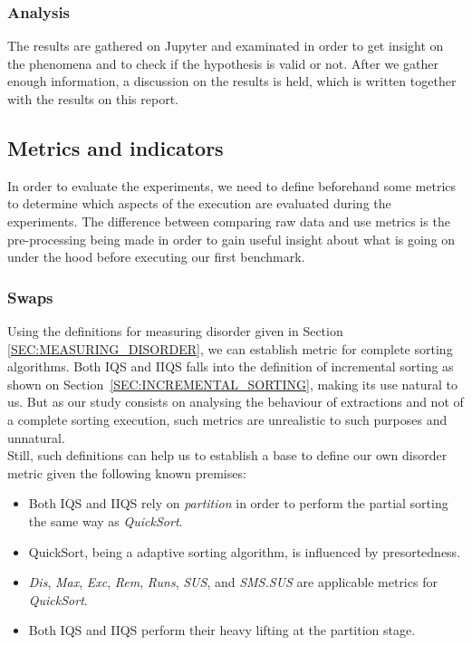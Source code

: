 \subsubsection{Analysis}
The results are gathered on Jupyter and examinated in order to get insight on the phenomena and to check if the hypothesis is valid or not. After we gather enough information, a discussion on the results is held, which is written together with the results on this report.\\

\subsection{Metrics and indicators}
In order to evaluate the experiments, we need to define beforehand some metrics to determine which aspects of the execution are evaluated during the experiments. The difference between comparing raw data and use metrics is the pre-processing being made in order to gain useful insight about what is going on under the hood before executing our first benchmark.\\

\subsubsection{Swaps}
Using the definitions for measuring disorder given in Section \ref{SEC:MEASURING_DISORDER}, we can establish metric for complete sorting algorithms. Both IQS and IIQS falls into the definition of incremental sorting as shown on Section~\ref{SEC:INCREMENTAL_SORTING}, making its use natural to us. But as our study consists on analysing the behaviour of extractions and not of a complete sorting execution, such metrics are unrealistic to such purposes and unnatural.\\

Still, such definitions can help us to establish a base to define our own disorder metric given the following known premises:\\

\begin{itemize}
    \item Both IQS and IIQS rely on \textit{partition} in order to perform the partial sorting the same way as \textit{QuickSort}.
    \item QuickSort, being a adaptive sorting algorithm, is influenced by presortedness.
    \item \textit{Dis}, \textit{Max}, \textit{Exc}, \textit{Rem}, \textit{Runs}, \textit{SUS}, and \textit{SMS.SUS} are applicable metrics for \textit{QuickSort}.
    \item Both IQS and IIQS perform their heavy lifting at the partition stage.
\end{itemize}

